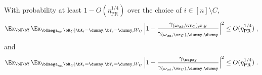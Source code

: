 \begin{lemma}\label{lem:norms-are-close}
	With probability at least $1 - O(\eta_{\text{PR}}^{1/4})$ over the choice of $i \in [n] \setminus C$, 
	\begin{equation}
		\label{eq:norms-are-close-s0}
		\Ex_{\bX \bY} \, \Ex_{\bOmega_{\mi} \bR_C | \bX_i = \dummy,\bY_i = \dummy, W_C} \, \Big | 1 - \frac{\gamma_{(\omega_{\mi}, \vr_C), x,y}}{\gamma_{(\omega_{\mi}, \vr_C),\dummy,\dummy}} \Big |^2 \leq O(\eta_{\text{PR}}^{1/4})\;,
	\end{equation}
	and
	\begin{equation}
		\label{eq:norms-are-close-s1}
		\Ex_{\bX \bY} \, \Ex_{\bOmega_{\mi} \bR_C | \bX_i = \dummy, \bY_i = \dummy, W_C} \, \Big | 1 - \frac{\gamma_\sspxy}{\gamma_{(\omega_{\mi}, \vr_C),\dummy,\dummy}} \Big |^2 \leq O(\eta_{\text{PR}}^{1/4})\;.
	\end{equation}
\end{lemma}

